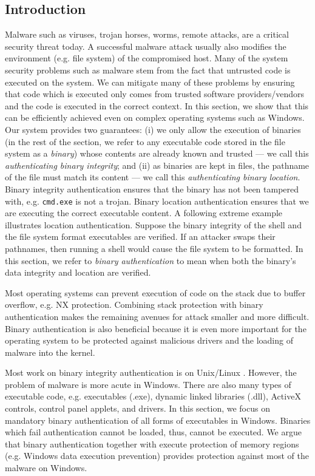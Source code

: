 \subsection{Introduction}
\label{sect:intro}

Malware such as viruses, trojan horses, worms, remote attacks, 
are a critical security threat today.
A successful malware attack usually also modifies
the environment (e.g. file system) of the compromised host.
Many of the system security problems such as malware stem from the fact that untrusted code is executed
on the system.
We can mitigate many of these problems by ensuring that code which is executed only comes
from trusted software providers/vendors and the code is executed in the correct context.
In this section, we show that this can be efficiently achieved even on complex
operating systems such
as Windows. Our system provides two guarantees:
(i) we only allow the execution of binaries (in the rest of the section, we refer
to any executable code stored in the file system as a {\em binary})
whose contents are already known and trusted --- we call this {\em authenticating binary integrity};
and (ii) as binaries are kept in files, the pathname of the file must 
match its content --- we call this {\em authenticating binary location}. 
Binary integrity authentication ensures that the binary has not been
tampered with, e.g. {\tt cmd.exe} is not a trojan.
Binary location authentication ensures that we are executing
the correct executable content. 
A following extreme example illustrates location authentication. 
Suppose the binary integrity of the shell and the file system format executables 
are verified. If an attacker swaps their pathnames,
then running a shell would cause the file system to be formatted.
In this section, we refer to {\em binary authentication} to mean when 
both the binary's data integrity and location are verified.

Most operating systems can prevent execution of code
on the stack due to buffer overflow, e.g. NX protection.
Combining stack protection with binary authentication
makes the remaining avenues for attack 
smaller and more difficult.
Binary authentication is also beneficial because it is even more important
for the operating system to be protected against malicious drivers
and the loading of malware into the kernel.

Most work on binary integrity authentication is on Unix/Linux
\cite{apvrille2004digsig,williams2002anti,doorn01signedexecutables}.
However, the problem of malware is more acute in Windows.
There are also many types of executable code,
e.g. executables (.exe), dynamic linked libraries (.dll), 
ActiveX controls, control panel applets, and drivers. 
In this section, we focus on mandatory binary authentication of all forms
of executables in Windows. 
Binaries which fail authentication cannot be loaded, thus,
cannot be executed. We argue that binary authentication together with 
execute protection of memory regions (e.g. Windows data execution prevention) 
provides protection against most of the malware on Windows.

